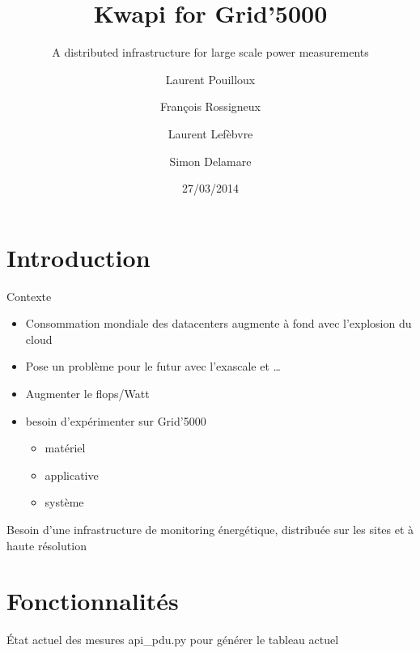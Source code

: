 \documentclass{beamer}
\title{Kwapi for Grid'5000}
\subtitle{A distributed infrastructure for large scale power measurements}
\author[LIP Team]{Laurent Pouilloux \and François Rossigneux \and Laurent
Lefèbvre \and Simon Delamare}
\institute[INRIA/LIP ENS-Lyon]{INRIA/LIP ENS-Lyon}
\date{27/03/2014}
\begin{document}
\begin{frame}
\titlepage
\end{frame}
% 
% 
\section{Introduction}

\begin{frame}{Contexte}
\begin{itemize}
   \item Consommation mondiale des datacenters augmente à fond avec l'explosion
   du cloud
   \item Pose un problème pour le futur avec l'exascale et \ldots
   \item Augmenter le flops/Watt
   \item besoin d'expérimenter sur Grid'5000
   \begin{itemize} 
     \item matériel
     \item applicative
     \item système 
   \end{itemize} 
\end{itemize}
    
\alert{Besoin d'une infrastructure de monitoring énergétique, distribuée sur
les sites et à haute résolution}
\end{frame}


\section{Fonctionnalités}

\begin{frame}{\'Etat actuel des mesures}
api\_pdu.py pour générer le tableau actuel
\end{frame}
\end{document}
